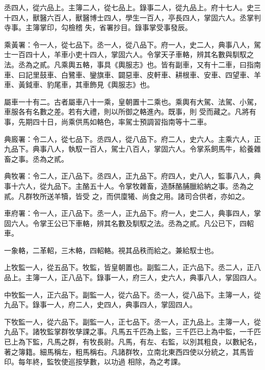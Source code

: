 \begin{pinyinscope}
 丞四人，從六品上。主簿二人，從七品上。錄事二人，從九品上。府十七人。史三十四人，獸醫六百人，獸醫博士四人，學生一百人，亭長四人，掌固六人。丞掌判寺事。主簿掌印，勾檢稽
 失，省署抄目。錄事掌受事發辰。



 乘黃署：令一人，從七品下。丞一人，從八品下。府一人，史二人，典事八人，駕士一百四十人，羊車小吏十四人，掌固六人。令掌天子車輅，辨其名數與馴馭之法。丞為之貳。凡乘輿五輅，事具《輿服志》也。皆有副車，又有十二車，曰指南車、曰記里鼓車、白鷺車、鑾旗車、闢惡車、皮軒車、耕根車、安車、四望車、羊車、黃鉞車、豹尾車，其車飾見《輿服志》也。



 屬車一十有二。古者屬車八十一乘，皇朝置十二乘也。乘輿有大駕、法駕、小駕，車服各有名數之差。若有大禮，則以所御之輅進內。既事，則
 受而藏之。凡將有事，先期四十日，尚乘供馬如輅色，率駕士預調習指南等十二車。



 典廄署：令二人，從七品下。丞四人，從八品下。府二人，史六人。主乘六人，正九品下。典事八人，執馭一百人，駕士八百人，掌固六人。令掌系飼馬牛，給養雜畜之事。丞為之貳。



 典牧署：令二人，正八品下。丞四人，正九品下。府四人，史八人，監事八人，典事十六人，從九品下。主酪五十人。令掌牧雜畜，造酥酪脯臘給納之事。丞為之貳。凡群牧所送羊犢，皆受
 之，而供廩犧、尚食之用。諸司合供者，亦如之。



 車府署：令一人，正八品下。丞一人，正九品下。府一人，史二人，典事四人，掌固六人。令掌王公已下車輅，辨其名數及馴馭之法。丞為之貳。凡公已下，四軺車。



 一象輅，二革軺，三木輅，四軺輅。視其品秩而給之。兼給馭士也。



 上牧監一人，從五品下。牧監，皆皇朝置也。副監二人，正六品下。丞二人，正八品上。主簿一人，正八品下。錄事一人，府三人，史六人，典事八人，掌固四人。



 中牧監一人，正六品下。副監一人，從六品下。丞一人，從八品下。主簿一人，從九品下。錄事一人，府二人，史四人，典事四人，掌固四人。



 下牧監一人，從六品下。副監一人，正七品下。丞一人，正九品上。主簿一人，從九品下。諸牧監掌群牧孳課之事。凡馬五千匹為上監，三千匹已上為中監，一千匹已上為下監，凡馬之群，有牧長尉。凡馬，有左、右監，以別其粗良，以數紀名，著之簿籍。細馬稱左，粗馬稱右。凡諸群牧，立南北東西四使以分統之，其馬皆印。每年終，監牧使巡按孳數，以功過
 相除，為之考課。




\end{pinyinscope}
